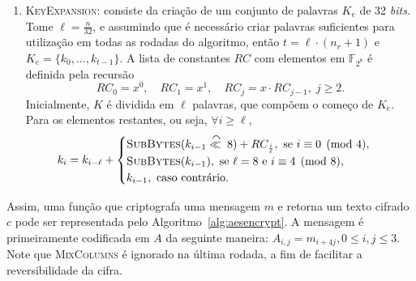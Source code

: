 \documentclass{ufsctex/ufsctex}
\begin{document}
\begin{enumerate}[labelsep=0.5em, label=\roman*.]
  \item \textsc{KeyExpansion}: consiste da criação de um conjunto de palavras
      $K_{e}$ de 32 \emph{bits}. Tome $\ell = \frac{n}{32}$, e assumindo que é
        necessário criar palavras suficientes para utilização em todas as
        rodadas do algoritmo, então $t = \ell \cdot (n_{r} + 1)$ e $K_{e} =
        \{k_{0}, \dots, k_{t - 1}\}$. A lista de constantes $RC$ com elementos
        em $\mathbb{F}_{2^{8}}$ é definida pela recursão
        \begin{equation}
          RC_{0} = x^{0}, \quad RC_{1} = x^{1}, \quad
          RC_{j} = x \cdot RC_{j - 1}, \; j \geq 2.
        \end{equation}
        Inicialmente, $K$ é dividida em $\ell$ palavras, que compõem o começo
        de $K_{e}$. Para os elementos restantes, ou seja, $\forall i \geq \ell$,
        \begin{equation}
          k_{i} = k_{i - \ell} +
          \begin{cases}
            \textsc{SubBytes}(k_{i - 1}
              \stackrel{\curvearrowright}{\ll{}} 8) + RC_{\frac{i}{\ell}},
              \text{ se } i \equiv 0 \pmod{4}, \\
            \textsc{SubBytes}(k_{i - 1}),
              \text{ se } \ell = 8 \text { e } i \equiv 4 \pmod{8}, \\
            k_{i - 1}, \text{ caso contrário.}
          \end{cases}
        \end{equation}

\end{enumerate}

Assim, uma função que criptografa uma mensagem $m$ e retorna um texto cifrado
$c$ pode ser representada pelo Algoritmo~\ref{alg:aesencrypt}. A mensagem é
primeiramente codificada em $A$ da seguinte maneira: $A_{i, j} = m_{i + 4j}, 0
\leq i, j \leq 3$. Note que \textsc{MixColumns} é ignorado na última rodada, a
fim de facilitar a reversibilidade da cifra.
\end{document}
